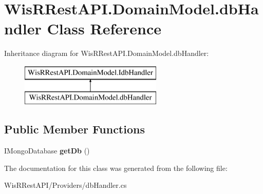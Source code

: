 \hypertarget{class_wis_r_rest_a_p_i_1_1_domain_model_1_1db_handler}{}\section{Wis\+R\+Rest\+A\+P\+I.\+Domain\+Model.\+db\+Handler Class Reference}
\label{class_wis_r_rest_a_p_i_1_1_domain_model_1_1db_handler}
Inheritance diagram for Wis\+R\+Rest\+A\+P\+I.\+Domain\+Model.\+db\+Handler\+:\begin{figure}[H]
\begin{center}
\leavevmode
\includegraphics[height=2.000000cm]{class_wis_r_rest_a_p_i_1_1_domain_model_1_1db_handler}
\end{center}
\end{figure}
\subsection*{Public Member Functions}
\begin{DoxyCompactItemize}
\item 
\hypertarget{class_wis_r_rest_a_p_i_1_1_domain_model_1_1db_handler_a8d508b65da9026af8fb71aa87f9ac411}{}I\+Mongo\+Database {\bfseries get\+Db} ()\label{class_wis_r_rest_a_p_i_1_1_domain_model_1_1db_handler_a8d508b65da9026af8fb71aa87f9ac411}

\end{DoxyCompactItemize}


The documentation for this class was generated from the following file\+:\begin{DoxyCompactItemize}
\item 
Wis\+R\+Rest\+A\+P\+I/\+Providers/db\+Handler.\+cs\end{DoxyCompactItemize}
